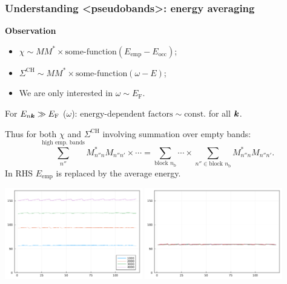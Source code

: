 \documentclass[t]{beamer}
\newcommand{\shortcode}[1]{\texttt{#1}}
\newcommand*{\const}{\text{const}}
\def\texttt#1{<#1>}%
\begin{document}
\begin{frame}[allowframebreaks]
\frametitle{Understanding \shortcode{pseudobands}: energy averaging}

\textbf{Observation} 
\begin{itemize}
    \item $\chi \sim M M^* \times \text{some-function}(E_{\text{emp}} - E_{\text{occ}})$;
    \item $\Sigma^{\text{CH}} \sim M M^* \times \text{some-function}(\omega - E)$; 
    \item We are only interested in $\omega \sim E_{\text{F}}$.
\end{itemize}

\vspace{0.5cm}

\faHandPointRight For $E_{n \vb*{k}} \gg E_{\text{F}}$ ($\omega$):  
$\text{energy-dependent factors} \sim \const.$ for all $\vb*{k}$.

\vspace{0.5cm}

Thus for both $\chi$ and $\Sigma^{\text{CH}}$ involving summation over empty bands:
\begin{equation}
    \sum_{n''}^{\text{high emp. bands}} M_{n'' n}^* M_{n'' n'} \times \cdots 
    = \sum_{\text{block $n_{\text{b}}$}} \cdots \times \sum_{n'' \in \text{block $n_{\text{b}}$}}
    M_{n'' n}^* M_{n'' n'}.
\end{equation}
In RHS $E_{\text{emp}}$ is replaced by the average energy.

\framebreak

\begin{center}
    \includegraphics[width=0.45\textwidth]{../data/energy/energies-different-blocks.png}
    \includegraphics[width=0.45\textwidth]{../data/energy/energies-same-blocks-1062.png}
\end{center}


\end{frame}
\end{document}
